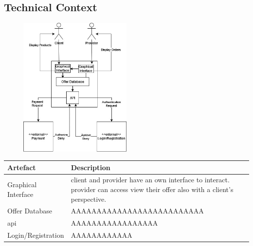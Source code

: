 \subsection{Technical Context}

\begin{figure}[H]
    \centering
    \includegraphics[width=0.5\textwidth]{assets/technical_context.jpg}
    \label{fig:technical_context}
\end{figure}

\begin{table}[H]
    \begin{tabularx}{\textwidth}{lX}
    \toprule
    Artefact & Description   \\
    \midrule
    Graphical Interface & \gls{client} and \gls{provider} have an own interface to interact. \gls{provider} can
    access view their offer also with a \gls{client}'s perspective. \\
    Offer Database & AAAAAAAAAAAAAAAAAAAAAAAAAA \\
    \gls{api} & AAAAAAAAAAAAAAAAA \\
    Login/Registration & AAAAAAAAAAAA  \\
    \bottomrule
    \end{tabularx}
\end{table}